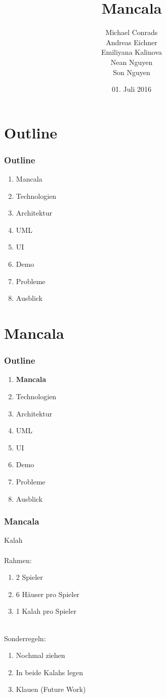 \documentclass[
	10pt,
	t		%
]{beamer}
\title{Mancala}
\subtitle{}
\author{Michael Conrads \\ Andreas Eichner \\ Emiliyana Kalinova \\ Nean Nguyen \\ Son Nguyen}
\date{01. Juli 2016}
\begin{document}
\AddToShipoutPicture{\TitlePicture}
\maketitle
\ClearShipoutPicture
\AddToShipoutPicture{\BackgroundPicture}

\section{Outline}
\begin{frame}
\frametitle{Outline}
\begin{enumerate}
\item Mancala
\item Technologien
\item Architektur
\item UML
\item UI
\item Demo
\item Probleme
\item Ausblick
\end{enumerate}
\end{frame}

\section{Mancala}
\begin{frame}
\frametitle{Outline}
\begin{enumerate}
\item \textbf{Mancala}
\item Technologien
\item Architektur
\item UML
\item UI
\item Demo
\item Probleme
\item Ausblick
\end{enumerate}
\end{frame}

\begin{frame}
\frametitle{Mancala}
Kalah\\[0.2cm]
\hfill \\
Rahmen:
\begin{enumerate}
	\item 2 Spieler
	\item 6 H\"auser pro Spieler
	\item 1 Kalah pro Spieler
\end{enumerate}
\hfill \\[0.4cm]
Sonderregeln:
\begin{enumerate}
	\item Nochmal ziehen
	\item In beide Kalahs legen
	\item Klauen (Future Work)
\end{enumerate}
\end{frame}
\end{document}
